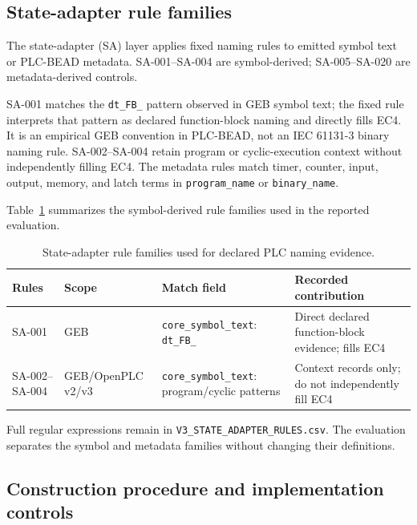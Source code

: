 \documentclass[manuscript,screen,review]{acmart}
\begin{document}
\subsection{State-adapter rule families}
\label{sec:state_adapter}

The state-adapter (SA) layer applies fixed naming rules to emitted symbol text or PLC-BEAD metadata. SA-001--SA-004 are symbol-derived; SA-005--SA-020 are metadata-derived controls.

SA-001 matches the \texttt{dt\_FB\_} pattern observed in GEB symbol text; the fixed rule interprets that pattern as declared function-block naming and directly fills EC4. It is an empirical GEB convention in PLC-BEAD, not an IEC 61131-3 binary naming rule. SA-002--SA-004 retain program or cyclic-execution context without independently filling EC4. The metadata rules match timer, counter, input, output, memory, and latch terms in \texttt{program\_name} or \texttt{binary\_name}.

Table~\ref{tab:s5_3} summarizes the symbol-derived rule families used in the reported evaluation.

\begin{table}[t]
\centering
\small
\caption{State-adapter rule families used for declared PLC naming evidence.}
\label{tab:s5_3}
\begin{tabularx}{\textwidth}{>{\raggedright\arraybackslash}X>{\raggedright\arraybackslash}X>{\raggedright\arraybackslash}X>{\raggedright\arraybackslash}X}
\toprule
Rules & Scope & Match field & Recorded contribution \\
\midrule
SA-001 & GEB & \texttt{core\_symbol\_text}: \texttt{dt\_FB\_} & Direct declared function-block evidence; fills EC4 \\
SA-002--SA-004 & GEB/OpenPLC v2/v3 & \texttt{core\_symbol\_text}: program/cyclic patterns & Context records only; do not independently fill EC4 \\
\bottomrule
\end{tabularx}
\end{table}

Full regular expressions remain in \texttt{V3\_STATE\_ADAPTER\_RULES.csv}. The evaluation separates the symbol and metadata families without changing their definitions.

\subsection{Construction procedure and implementation controls}
\end{document}
